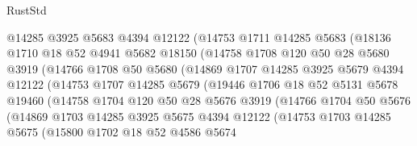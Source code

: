 \begin{lexlean}{RustStd}
\begin{coremodule}
                  @14285
                  @3925
                  @5683
                  @4394
                  @12122
                  (@14753
                    @1711
                    @14285
                    @5683
                    (@18136
                      @1710
                      @18
                      @52
                      @4941
                      @5682
                      @18150
                      (@14758
                        @1708
                        @120
                        @50
                        @28
                        @5680
                        @3919
                        (@14766
                          @1708
                          @50
                          @5680
                          (@14869
                            @1707
                            @14285
                            @3925
                            @5679
                            @4394
                            @12122
                            (@14753
                              @1707
                              @14285
                              @5679
                              (@19446
                                @1706
                                @18
                                @52
                                @5131
                                @5678
                                @19460
                                (@14758
                                  @1704
                                  @120
                                  @50
                                  @28
                                  @5676
                                  @3919
                                  (@14766
                                    @1704
                                    @50
                                    @5676
                                    (@14869
                                      @1703
                                      @14285
                                      @3925
                                      @5675
                                      @4394
                                      @12122
                                      (@14753
                                        @1703
                                        @14285
                                        @5675
                                        (@15800
                                          @1702
                                          @18
                                          @52
                                          @4586
                                          @5674

\end{coremodule}
\end{lexlean}
